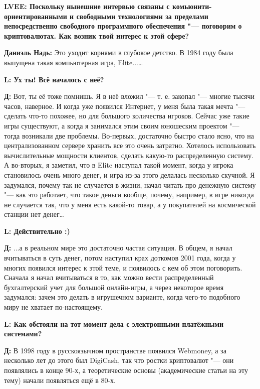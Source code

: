 \documentclass[10pt, a5paper]{article}
\begin{document}
{\noindent \bf LVEE: Поскольку нынешние интервью связаны с комьюни\-ти-ориентированными и свободными технологиями за пределами непосредственно свободного программного обеспечения "--- поговорим о криптовалютах. Как возник твой интерес к этой сфере?}

{\noindent \bf Даниэль Надь:} Это уходит корнями в глубокое детство. В 1984 году была выпущена такая компьютерная игра, Elite...\ldots 

{\noindent \bf L: Ух ты! Всё началось с неё?}

{\noindent \bf Д:} Вот, ты её тоже помнишь. Я в неё вложил "--- т. е. закопал "--- многие тысячи часов, наверное. И когда уже появился Интернет, у меня была такая мечта "--- сделать что-то похожее, но для большого количества игроков. Сейчас уже такие игры существуют, а когда я занимался этим  своим юношеским проектом "--- тогда возникали две проблемы. Во-первых, достаточно быстро стало ясно, что на централизованном сервере хранить все это очень затратно. Хотелось использовать вычислительные мощности клиентов, сделать какую-то распределенную систему. А во-вторых, я заметил, что в Elite наступал такой момент, когда у игрока становилось очень много денег, и игра из-за этого делалась несколько скучной. Я задумался, почему так не случается в жизни, начал читать про денежную систему "--- как это работает, что такое деньги вообще, почему, например, в игре никогда не случается так, что у меня есть какой-то товар, а у покупателей на космической станции нет денег\ldots

{\noindent \bf L: Действительно :)} 

{\noindent \bf Д:} ...а в реальном мире это достаточно частая ситуация. В общем, я начал вчитываться в суть денег, потом наступил крах доткомов 2001 года, когда у многих появился интерес к этой теме, и появилось с кем об этом поговорить. Сначала я начал вчитываться в то, как можно вести распределенный бухгалтерский учет для большой онлайн-игры, а через некоторое время задумался: зачем это делать в игрушечном варианте, когда чего-то подобного миру не хватает по-настоящему. 

{\noindent \bf L: Как обстояли на тот момент дела с электронными платёжными системами?}

{\noindent \bf Д:}  В 1998 году в русскоязычном пространстве появился Webmoney, а за несколько лет до этого был DigiCash, так что ростки криптовалют "--- они появлялись в конце 90-х, а теоретические основы (академические статьи на эту тему) начали появляться ещё в 80-х.
\end{document}
